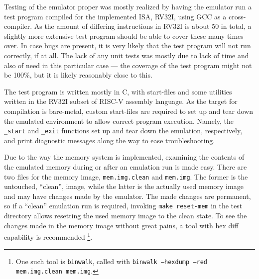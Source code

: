 \documentclass[a4paper]{amsart}
\begin{document}
\noindent
Testing of the emulator proper was mostly realized by having the emulator run a test program compiled for the implemented ISA, RV32I, using GCC as a cross-compiler.
As the amount of differing instructions in RV32I is about 50 in total, a slightly more extensive test program should be able to cover these many times over.
In case bugs are present, it is very likely that the test program will not run correctly, if at all.
The lack of any unit tests was mostly due to lack of time and also of need in this particular case --- the coverage of the test program might not be 100\%, but it is likely reasonably close to this.

The test program is written mostly in C, with start-files and some utilities written in the RV32I subset of RISC-V assembly language.
As the target for compilation is bare-metal, custom start-files are required to set up and tear down the emulated environment to allow correct program execution.
Namely, the \texttt{\_start} and \texttt{\_exit} functions set up and tear down the emulation, respectively, and print diagnostic messages along the way to ease troubleshooting.

Due to the way the memory system is implemented, examining the contents of the emulated memory during or after an emulation run is made easy.
There are two files for the memory image, \texttt{mem.img.clean} and \texttt{mem.img}.
The former is the untouched, ``clean'', image, while the latter is the actually used memory image and may have changes made by the emulator.
The made changes are permanent, so if a ``clean'' emulation run is required, invoking \texttt{make reset-mem} in the test directory allows resetting the used memory image to the clean state.
To see the changes made in the memory image without great pains, a tool with hex diff capability is recommended%
\footnote{One such tool is \texttt{binwalk}, called with \texttt{binwalk --hexdump --red mem.img.clean mem.img}.}.
\end{document}
